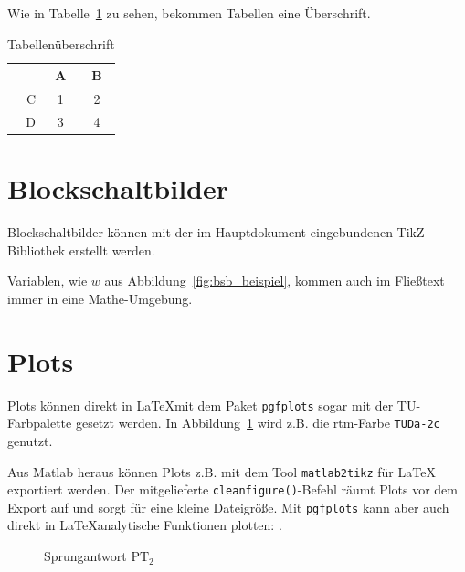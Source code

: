 Wie in Tabelle~\ref{tab:tabelle} zu sehen, bekommen Tabellen eine Überschrift.
%
\begin{table}
	\centering
	\caption{Tabellenüberschrift}	
	\begin{tabular}{r|cc}
		& A & B \\
		\hline
		C & 1 & 2 \\
		D & 3 & 4 \\
	\end{tabular}
	\label{tab:tabelle}
\end{table}
%

\section{Blockschaltbilder}
Blockschaltbilder können mit der im Hauptdokument eingebundenen TikZ-Bibliothek erstellt werden.
%
\begin{center} %
	
	\label{fig:bsb_beispiel}
\end{center}

Variablen, wie $w$ aus Abbildung~\ref{fig:bsb_beispiel}, kommen auch im Fließtext immer in eine Mathe-Umgebung.

\section{Plots}
Plots können direkt in \LaTeX mit dem Paket \texttt{pgfplots} sogar mit der TU-Farbpalette gesetzt werden.
In Abbildung~\ref{fig:step_pt2} wird z.B. die rtm-Farbe \textcolor{TUDa-2c}{\texttt{TUDa-2c}} genutzt.

Aus Matlab heraus können Plots z.B. mit dem Tool \texttt{matlab2tikz} für \LaTeX{} exportiert werden.
Der mitgelieferte \texttt{cleanfigure()}-Befehl räumt Plots vor dem Export auf und sorgt für eine kleine Dateigröße.
Mit \texttt{pgfplots} kann aber auch direkt in \LaTeX analytische Funktionen plotten: 
.

\begin{figure}
	\centering
	
	\caption{Sprungantwort $\mathrm{PT}_2$}
	\label{fig:step_pt2}
\end{figure}